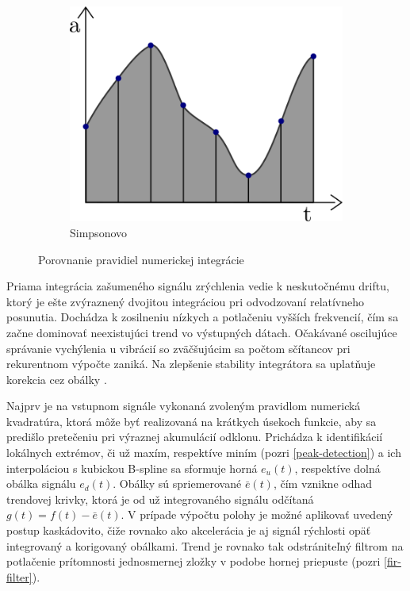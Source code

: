 \begin{figure}[h]
\begin{subfigure}[b]{0.32\textwidth}
    \centering
    \includegraphics[width=\textwidth]{figures/simpson-rule.png}
    \caption{Simpsonovo}
\end{subfigure}
\caption{Porovnanie pravidiel numerickej integrácie}
\end{figure}

Priama integrácia zašumeného signálu zrýchlenia vedie k neskutočnému driftu, ktorý je ešte zvýraznený dvojitou integráciou pri
odvodzovaní relatívneho posunutia. Dochádza k zosilneniu nízkych a potlačeniu vyšších frekvencií, čím sa začne dominovať neexistujúci
trend vo výstupných dátach. Očakávané oscilujúce správanie vychýlenia u vibrácií so zväčšujúcim sa počtom sčítancov pri rekurentnom
výpočte zaniká. Na zlepšenie stability integrátora sa uplatňuje korekcia cez obálky \cite{integration-acceleration-envelopes}.

Najprv je na vstupnom signále vykonaná zvoleným pravidlom numerická kvadratúra, ktorá môže byť realizovaná na krátkych
úsekoch funkcie, aby sa predišlo pretečeniu pri výraznej akumulácií odklonu. Prichádza k identifikácií lokálnych extrémov, či už maxím,
respektíve miním (pozri \ref{peak-detection}) a ich interpoláciou s kubickou B-spline sa sformuje horná $e_u(t)$, respektíve dolná
obálka signálu $e_d(t)$. Obálky sú spriemerované $\bar{e}(t)$, čím vznikne odhad trendovej krivky, ktorá je od už integrovaného
signálu odčítaná $g(t) = f(t) - \bar{e}(t)$. V prípade výpočtu polohy je možné aplikovať uvedený postup kaskádovito, čiže rovnako
ako akcelerácia je aj signál rýchlosti opäť integrovaný a korigovaný obálkami. Trend je rovnako tak odstrániteľný filtrom na
potlačenie prítomnosti jednosmernej zložky v podobe hornej priepuste (pozri \ref{fir-filter}).

